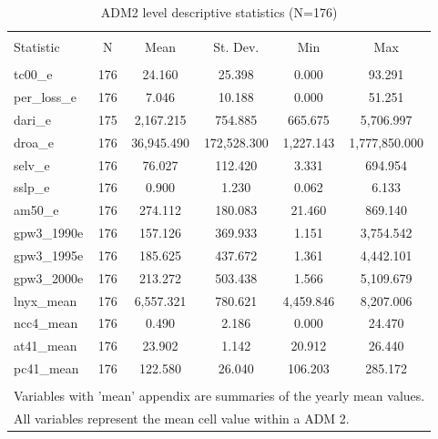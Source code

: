 \documentclass{article}\usepackage[]{graphicx}\usepackage[]{color}
\newenvironment{knitrout}{}{}  %
\begin{document}
\begin{knitrout}

\begin{table}[!htbp] \centering 
  \caption{ADM2 level descriptive statistics (N=176)} 
  \label{} 
\begin{tabular}{@{\extracolsep{5pt}}lccccc} 
\\[-1.8ex]\hline 
\hline \\[-1.8ex] 
Statistic & \multicolumn{1}{c}{N} & \multicolumn{1}{c}{Mean} & \multicolumn{1}{c}{St. Dev.} & \multicolumn{1}{c}{Min} & \multicolumn{1}{c}{Max} \\ 
\hline \\[-1.8ex] 
tc00\_e & 176 & 24.160 & 25.398 & 0.000 & 93.291 \\ 
per\_loss\_e & 176 & 7.046 & 10.188 & 0.000 & 51.251 \\ 
dari\_e & 175 & 2,167.215 & 754.885 & 665.675 & 5,706.997 \\ 
droa\_e & 176 & 36,945.490 & 172,528.300 & 1,227.143 & 1,777,850.000 \\ 
selv\_e & 176 & 76.027 & 112.420 & 3.331 & 694.954 \\ 
sslp\_e & 176 & 0.900 & 1.230 & 0.062 & 6.133 \\ 
am50\_e & 176 & 274.112 & 180.083 & 21.460 & 869.140 \\ 
gpw3\_1990e & 176 & 157.126 & 369.933 & 1.151 & 3,754.542 \\ 
gpw3\_1995e & 176 & 185.625 & 437.672 & 1.361 & 4,442.101 \\ 
gpw3\_2000e & 176 & 213.272 & 503.438 & 1.566 & 5,109.679 \\ 
lnyx\_mean & 176 & 6,557.321 & 780.621 & 4,459.846 & 8,207.006 \\ 
ncc4\_mean & 176 & 0.490 & 2.186 & 0.000 & 24.470 \\ 
at41\_mean & 176 & 23.902 & 1.142 & 20.912 & 26.440 \\ 
pc41\_mean & 176 & 122.580 & 26.040 & 106.203 & 285.172 \\ 
\hline \\[-1.8ex] 
\multicolumn{6}{l}{Variables with 'mean' appendix are summaries of the yearly mean values.} \\ 
\multicolumn{6}{l}{All variables represent the mean cell value within a ADM 2.} \\ 
\end{tabular} 
\end{table} 



\end{knitrout}
\end{document}
